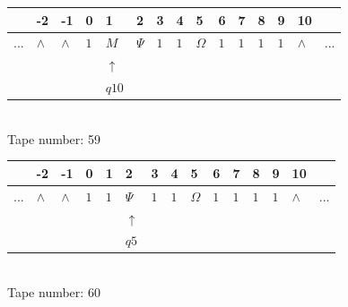 \documentclass[11pt]{article}
\begin{document}
\begin{table}[H]
\centering
\begin{tabular}{lllllllllllllll}
 & -2 & -1 & 0 & 1 & 2 & 3 & 4 & 5 & 6 & 7 & 8 & 9 & 10 & \\
\hline
$...$ & \multicolumn{1}{|l|}{$\wedge$} & \multicolumn{1}{|l|}{$\wedge$} & \multicolumn{1}{|l|}{$1$} & \multicolumn{1}{|l|}{$M$} & \multicolumn{1}{|l|}{$\Psi$} & \multicolumn{1}{|l|}{$1$} & \multicolumn{1}{|l|}{$1$} & \multicolumn{1}{|l|}{$\Omega$} & \multicolumn{1}{|l|}{$1$} & \multicolumn{1}{|l|}{$1$} & \multicolumn{1}{|l|}{$1$} & \multicolumn{1}{|l|}{$1$} & \multicolumn{1}{|l|}{$\wedge$} & $...$\\
\hline
&  &  &  & $\uparrow$ &  &  &  &  &  &  &  &  &  &  \\
&  &  &  & $ q10 $ &  &  &  &  &  &  &  &  &  &  \\
\end{tabular}
\\
Tape number: 59
\noindent\makebox[\linewidth]{\hdashrule{\textwidth}{1pt}{1pt}}\end{table}
\clearpage

\begin{table}[H]
\centering
\begin{tabular}{lllllllllllllll}
 & -2 & -1 & 0 & 1 & 2 & 3 & 4 & 5 & 6 & 7 & 8 & 9 & 10 & \\
\hline
$...$ & \multicolumn{1}{|l|}{$\wedge$} & \multicolumn{1}{|l|}{$\wedge$} & \multicolumn{1}{|l|}{$1$} & \multicolumn{1}{|l|}{$1$} & \multicolumn{1}{|l|}{$\Psi$} & \multicolumn{1}{|l|}{$1$} & \multicolumn{1}{|l|}{$1$} & \multicolumn{1}{|l|}{$\Omega$} & \multicolumn{1}{|l|}{$1$} & \multicolumn{1}{|l|}{$1$} & \multicolumn{1}{|l|}{$1$} & \multicolumn{1}{|l|}{$1$} & \multicolumn{1}{|l|}{$\wedge$} & $...$\\
\hline
&  &  &  &  & $\uparrow$ &  &  &  &  &  &  &  &  &  \\
&  &  &  &  & $ q5 $ &  &  &  &  &  &  &  &  &  \\
\end{tabular}
\\
Tape number: 60
\noindent\makebox[\linewidth]{\hdashrule{\textwidth}{1pt}{1pt}}\end{table}
\end{document}
